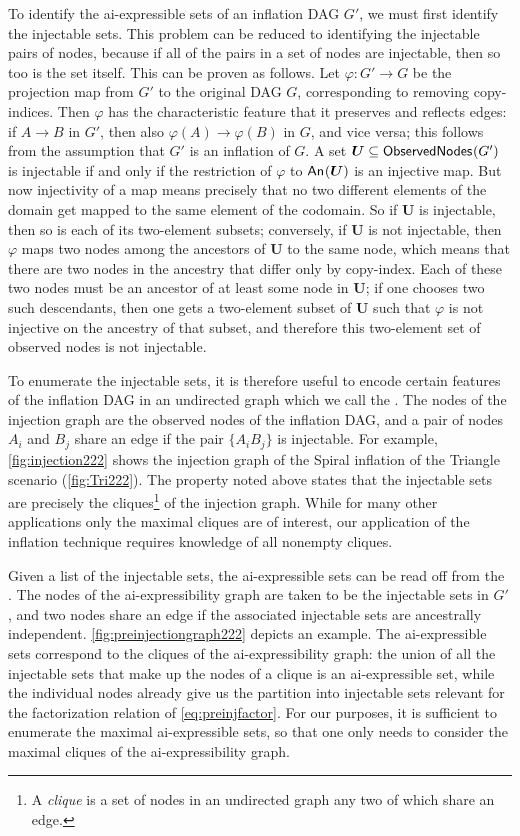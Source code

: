 \documentclass[aps,english,10pt,superscriptaddress,onecolumn,twoside,longbibliography,pra,floatfix,fleqn,nofootinbib]{revtex4-1}%
\newcommand*{\tblue}[1]{{\color{MidnightBlue}{\textbf{#1}}}}
\theoremstyle{definition}
\newcounter{example}[section]
\newcommand{\An}[2][]{{\mathsf{An}_{#1}}\parenths{#2}}
\newcommand{\SmallNamedFunction}[3][]{\operatorname{\mathsf{#2}}_{#1}\parenths{#3}}
\newcommand{\obsnodes}[1]{\SmallNamedFunction{ObservedNodes}{#1}}
\DeclarePairedDelimiter{\parenths}{\lparen}{\rparen}
\begin{document}
To identify the ai-expressible sets of an inflation DAG $G'$, we must first identify the injectable sets. This problem can be reduced to identifying the injectable pairs of nodes, because if all of the pairs in a set of nodes are injectable, then so too is the set itself. This can be proven as follows.   
Let $\varphi : G' \to G$ be the projection map from $G'$ to the original DAG $G$, corresponding to removing copy-indices.  Then $\varphi$ has the characteristic feature that it preserves and reflects edges: if $A  \to B$ in $G'$, then also $\varphi(A) \to \varphi(B)$ in $G$, and vice versa; this follows from the assumption that $G'$ is an inflation of $G$. 
A set $\bm{U} \subseteq \obsnodes{G'}$ is injectable if and only if the
restriction of $\varphi$ to $\An{\bm{U}}$ is an injective map. 
But now injectivity of a map means precisely that no two different
elements of the domain get mapped to the same element of the codomain.
So if $\bm{U}$ is injectable, then so is each of its two-element subsets;
conversely, if $\bm{U}$ is not injectable, then $\varphi$ maps two nodes among the
ancestors of $\bm{U}$ to the same node, which means that there are two nodes in the
ancestry that differ only by copy-index. Each of these two nodes must be
an ancestor of at least some node in $\bm{U}$; if one chooses two such
descendants, then one gets a two-element subset of $\bm{U}$ such that $\varphi$ is not
injective on the ancestry of that subset, and therefore this two-element
set of observed nodes is not injectable.

To enumerate the injectable sets, it is therefore useful to encode certain features of the inflation DAG in an undirected graph which we call the \tblue{injection graph}. The nodes of the injection graph are the observed nodes of the inflation DAG, and a pair of nodes $A_i$ and $B_j$ share an edge if the pair $\{ A_i B_j\}$ is injectable. For example, \cref{fig:injection222} shows the injection graph of the Spiral inflation of the Triangle scenario (\cref{fig:Tri222}).
The property noted above states that the injectable sets are precisely the cliques\footnote{A \emph{clique} is a set of nodes in an undirected graph any two of which share an edge.} of the injection graph.
While for many other applications only the maximal cliques are of interest, our application of the inflation technique requires knowledge of all nonempty cliques. 

Given a list of the injectable sets, the ai-expressible sets can be read off from the \tblue{ai-expressability graph}.
The nodes of the ai-expressibility graph are taken to be the injectable sets in $G'$, and two nodes share an edge if the associated injectable sets are ancestrally independent.
\cref{fig:preinjectiongraph222} depicts an example. 
The ai-expressible sets correspond to the cliques of the ai-expressibility graph: the union of all the injectable sets that make up the nodes of a clique is an ai-expressible set, while the individual nodes already give us the partition into injectable sets relevant for the factorization relation of \cref{eq:preinjfactor}. 
For our purposes, it is sufficient to enumerate the maximal ai-expressible sets, so that one only needs to consider the maximal cliques of the ai-expressibility graph.
\end{document}
